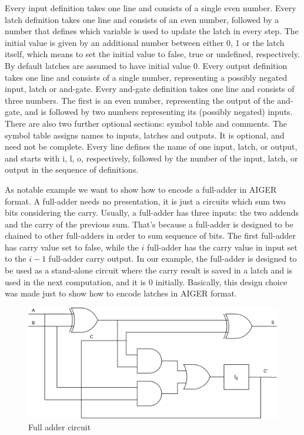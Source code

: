 Every input definition takes one line and consists of a single even number.
Every latch definition takes one line and consists of an even number, followed by a number that defines which variable is used to update the latch in every step. The initial value is given by an additional number between either 0, 1 or the latch itself, which means to set the initial value to false, true or undefined, respectively. By default latches are assumed to have initial value 0.
Every output definition takes one line and consists of a single number, representing a possibly negated input, latch or and-gate. 
Every and-gate definition takes one line and consists of three numbers. The first is an even number, representing the output of the and-gate, and is followed by two numbers representing its (possibly negated) inputs.
There are also two further optional sections: symbol table and comments. The symbol table assigns names to inputs, latches and outputs. It is optional, and need not be complete. Every line defines the name of one input, latch, or output, and starts with i, l, o, respectively,
followed by the number of the input, latch, or output in the sequence of definitions.

As notable example we want to show how to encode a full-adder in AIGER format. A full-adder needs no presentation, it is just a circuits which sum two bits considering the carry.
Usually, a full-adder has three inputs: the two addends and the carry of the previous sum. That's because a full-adder is designed to be chained to other full-adders in order to sum sequence of bits. 
The first full-adder has carry value set to false, while the $i$ full-adder has the carry value in input set to the $i-1$ full-adder carry output. 
In our example, the full-adder is designed to be used as a stand-alone circuit where the carry result is saved in a latch and is used in the next computation, and it is $0$ initially.
Basically, this design choice was made just to show how to encode latches in AIGER format.

\begin{figure}[!htp]
    \centering
    \includegraphics[width=0.6\linewidth]{figures/full-adder-circuit.png}
    \caption{Full adder circuit}
    \label{fig:full-adder-circuit}
\end{figure}

